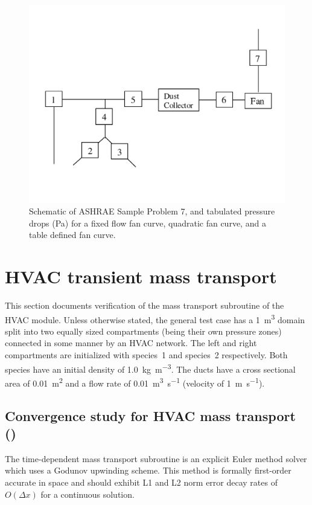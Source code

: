 \documentclass[11pt]{book}
\begin{document}
\begin{figure}[ht]
\centering
\includegraphics[width=4.in]{FIGURES/ashrae_7}
\caption[Results of  test cases]{Schematic of ASHRAE Sample Problem 7, and tabulated pressure drops (Pa) for a fixed flow fan curve, quadratic fan curve, and a table defined fan curve.}
\label{ASHRAE7}
\end{figure}

\section{HVAC transient mass transport}
This section documents verification of the mass transport subroutine of the HVAC module. Unless otherwise stated, the general test case has a \SI{1}{\meter\cubed} domain split into two equally sized compartments (being their own pressure zones) connected in some manner by an HVAC network. The left and right compartments are initialized with species~1 and species~2 respectively. Both species have an initial density of \SI[per-mode=symbol]{1.0}{\kilogram\per\meter\cubed}. The ducts have a cross sectional area of \SI{0.01}{m^2} and a flow rate of \SI[per-mode=symbol]{0.01}{\meter\cubed\per\second} (velocity of \SI[per-mode=symbol]{1}{\meter\per\second}).

\subsection{Convergence study for HVAC mass transport (\texorpdfstring{}{HVAC\_mass\_transport\_conv\_x})}
\label{HVAC_mass_transport_conv_0020}
\label{HVAC_mass_transport_conv_0040}
\label{HVAC_mass_transport_conv_0080}
\label{HVAC_mass_transport_conv_0160}
\label{HVAC_mass_transport_conv_0320}
The time-dependent mass transport subroutine is an explicit Euler method solver which uses a Godunov upwinding scheme. This method is formally first-order accurate in space and should exhibit L1 and L2 norm error decay rates of \(O(\Delta x)\) for a continuous solution.
\end{document}
